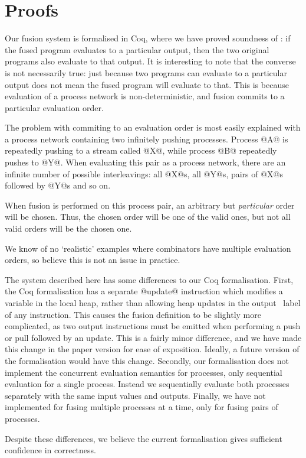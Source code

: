 
\section{Proofs}
\label{s:Proofs}

Our fusion system is formalised in Coq, where we have proved soundness of : if the fused program evaluates to a particular output, then the two original programs also evaluate to that output.
It is interesting to note that the converse is not necessarily true: just because two programs can evaluate to a particular output does not mean the fused program will evaluate to that.
This is because evaluation of a process network is non-deterministic, and fusion commits to a particular evaluation order.

The problem with commiting to an evaluation order is most easily explained with a process network containing two infinitely pushing processes.
Process @A@ is repeatedly pushing to a stream called @X@, while process @B@ repeatedly pushes to @Y@.
When evaluating this pair as a process network, there are an infinite number of possible interleavings: all @X@s, all @Y@s, pairs of @X@s followed by @Y@s and so on.

When fusion is performed on this process pair, an arbitrary but \emph{particular} order will be chosen.
Thus, the chosen order will be one of the valid ones, but not all valid orders will be the chosen one.

We know of no `realistic' examples where combinators have multiple evaluation orders, so believe this is not an issue in practice.

The system described here has some differences to our Coq formalisation.
First, the Coq formalisation has a separate @update@ instruction which modifies a variable in the local heap, rather than allowing heap updates in the output \Next~label of any instruction.
This causes the fusion definition to be slightly more complicated, as two output instructions must be emitted when performing a push or pull followed by an update.
This is a fairly minor difference, and we have made this change in the paper version for ease of exposition.
Ideally, a future version of the formalisation would have this change.
Secondly, our formalisation does not implement the concurrent evaluation semantics for processes, only sequential evaluation for a single process.
Instead we sequentially evaluate both processes separately with the same input values and outputs.
Finally, we have not implemented  for fusing multiple processes at a time, only  for fusing pairs of processes.

Despite these differences, we believe the current formalisation gives sufficient confidence in correctness.

